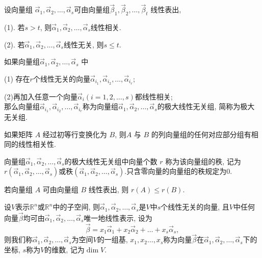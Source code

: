 \begin{thm}
设向量组 $\vec{\alpha}_1,\vec{\alpha}_2,\dots, \vec{\alpha}_s$可由向量组$\vec{\beta}_1,\vec{\beta}_2,\dots,\vec{\beta}_t$ 线性表出,

(1). 若$s>t$, 则$\vec{\alpha}_1,\vec{\alpha}_2,\dots, \vec{\alpha}_s$线性相关.

(2). 若$\vec{\alpha}_1,\vec{\alpha}_2,\dots, \vec{\alpha}_s$线性无关, 则$s\leq t$.
\end{thm}

\begin{Def}
如果向量组$\vec{\alpha}_1,\vec{\alpha}_2,\dots, \vec{\alpha}_s$ 中

(1) 存在$r$个线性无关的向量$\vec{\alpha}_{i_1},\vec{\alpha}_{i_2},\dots, \vec{\alpha}_{i_r}$;

(2)再加入任意一个向量$\vec{\alpha}_i(i=1,2,\dots,s)$都线性相关;\\
那么向量组$\vec{\alpha}_{i_1},\vec{\alpha}_{i_2},\dots, \vec{\alpha}_{i_r}$称为向量组$\vec{\alpha}_1,\vec{\alpha}_2,\dots, \vec{\alpha}_s$的极大线性无关组, 简称为极大无关组.


\end{Def}

\begin{thm}
如果矩阵 $A$ 经过初等行变换化为 $B$, 则$ A$ 与 $B$ 的列向量组的任何对应部分组有相同的线性相关性.

\end{thm}

\begin{Def}
向量组$\vec{\alpha}_1,\vec{\alpha}_2,\dots, \vec{\alpha}_s$的极大线性无关组中向量个数 $r$ 称为该向量组的秩, 记为$r(\vec{\alpha}_1,\vec{\alpha}_2,\dots, \vec{\alpha}_s)$或秩$(\vec{\alpha}_1,\vec{\alpha}_2,\dots, \vec{\alpha}_s)$.只含零向量的向量组的秩规定为0.
\end{Def}

\begin{thm}
若向量组 $A$ 可由向量组 $B$ 线性表出,  则 $r(A)\leq
r(B)$.
\end{thm}

\begin{Def}
设$V$表示$\mathbb{R}^n$或$\mathbb{R}^n$中的子空间, 则$\vec{\alpha}_1,\vec{\alpha}_2,\dots, \vec{\alpha}_s$是$V$中$s$个线性无关的向量, 且$V$中任何向量$\vec{\beta}$均可由$\vec{\alpha}_1,\vec{\alpha}_2,\dots, \vec{\alpha}_s$唯一地线性表示, 设为
$$\vec{\beta}=x_1\vec{\alpha}_1+x_2\vec{\alpha}_2+\dots+x_s \vec{\alpha}_s,$$
则我们称$\vec{\alpha}_1,\vec{\alpha}_2,\dots, \vec{\alpha}_s$为空间$V$的一组基, $x_1,x_2\dots,x_s$称为向量$\vec{\beta}$在$\vec{\alpha}_1,\vec{\alpha}_2,\dots, \vec{\alpha}_s$下的坐标, $s$称为$V$的维数, 记为$\dim V$.

\end{Def}


